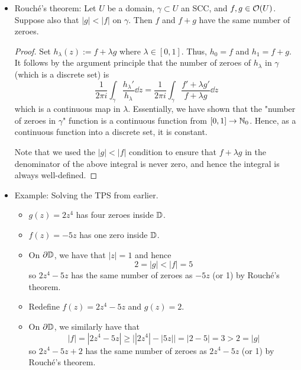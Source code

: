 \documentclass[../notes.tex]{subfiles}
\begin{document}
\begin{itemize}
\begin{itemize}
    \end{itemize}
    \item Rouch\'{e}'s theorem: Let $U$ be a domain, $\gamma\subset U$ an SCC, and $f,g\in\mathcal{O}(U)$. Suppose also that $|g|<|f|$ on $\gamma$. Then $f$ and $f+g$ have the same number of zeroes.
    \begin{proof}
        Set $h_\lambda(z):=f+\lambda g$ where $\lambda\in[0,1]$. Thus, $h_0=f$ and $h_1=f+g$. It follows by the argument principle that the number of zeroes of $h_\lambda$ in $\gamma$ (which is a discrete set) is
        \begin{equation*}
            \frac{1}{2\pi i}\int_\gamma\frac{h_\lambda'}{h_\lambda}\dd{z} = \frac{1}{2\pi i}\int_\gamma\frac{f'+\lambda g'}{f+\lambda g}\dd{z}
        \end{equation*}
        which is a continuous map in $\lambda$. Essentially, we have shown that the "number of zeroes in $\gamma$" function is a continuous function from $[0,1]\to\mathbb{N}_0$. Hence, as a continuous function into a discrete set, it is constant.\par
        Note that we used the $|g|<|f|$ condition to ensure that $f+\lambda g$ in the denominator of the above integral is never zero, and hence the integral is always well-defined.
    \end{proof}
    \item Example: Solving the TPS from earlier.
    \begin{itemize}
        \item $g(z)=2z^4$ has four zeroes inside $\mathbb{D}$.
        \item $f(z)=-5z$ has one zero inside $\mathbb{D}$.
        \item On $\partial\mathbb{D}$, we have that $|z|=1$ and hence
        \begin{equation*}
            2 = |g| < |f| = 5
        \end{equation*}
        so $2z^4-5z$ has the same number of zeroes as $-5z$ (or 1) by Rouch\'{e}'s theorem.
        \item Redefine $f(z)=2z^4-5z$ and $g(z)=2$.
        \item On $\partial\mathbb{D}$, we similarly have that
        \begin{equation*}
            |f| = |2z^4-5z|
            \geq \big| |2z^4|-|5z| \big|
            = |2-5|
            = 3
            > 2
            = |g|
        \end{equation*}
        so $2z^4-5z+2$ has the same number of zeroes as $2z^4-5z$ (or 1) by Rouch\'{e}'s theorem.
    \end{itemize}

\end{itemize}
\end{document}
